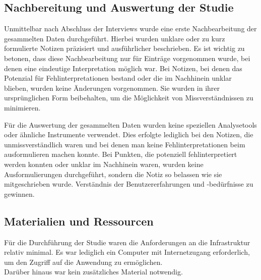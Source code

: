\subsection{Nachbereitung und Auswertung der Studie}

Unmittelbar nach Abschluss der Interviews wurde eine erste Nachbearbeitung der gesammelten Daten durchgeführt. Hierbei wurden unklare oder zu kurz formulierte Notizen präzisiert und ausführlicher beschrieben. Es ist wichtig zu betonen, dass diese Nachbearbeitung nur für Einträge vorgenommen wurde, bei denen eine eindeutige Interpretation möglich war. Bei Notizen, bei denen das Potenzial für Fehlinterpretationen bestand oder die im Nachhinein unklar blieben, wurden keine Änderungen vorgenommen. Sie wurden in ihrer ursprünglichen Form beibehalten, um die Möglichkeit von Missverständnissen zu minimieren.

Für die Auswertung der gesammelten Daten wurden keine speziellen Analysetools oder ähnliche Instrumente verwendet. Dies erfolgte lediglich bei den Notizen, die unmissverständlich waren und bei denen man keine Fehlinterpretationen beim ausformulieren machen konnte. Bei Punkten, die potenziell fehlinterpretiert werden konnten oder unklar im Nachhinein waren, wurden keine Ausformulierungen durchgeführt, sondern die Notiz so belassen wie sie mitgeschrieben wurde. Verständnis der Benutzererfahrungen und -bedürfnisse zu gewinnen.



\subsection{Materialien und Ressourcen}

Für die Durchführung der Studie waren die Anforderungen an die Infrastruktur relativ minimal. Es war lediglich ein Computer mit Internetzugang erforderlich, um den Zugriff auf die Anwendung zu ermöglichen.\\
Darüber hinaus war kein zusätzliches Material notwendig.

 
 

